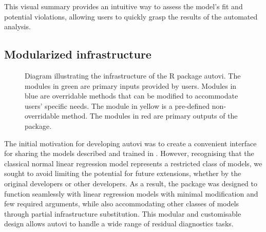 \documentclass[
doublespace,
  times]{anzsauth}
\begin{document}
This visual summary provides an intuitive way to assess the model's fit
and potential violations, allowing users to quickly grasp the results of
the automated analysis.

\subsection{Modularized infrastructure}\label{sec-autovi-infrastructure}

\begin{figure}


\caption{\label{fig-autovi-diag}Diagram illustrating the infrastructure
of the \textsf{R} package \textsf{autovi}. The modules in green are
primary inputs provided by users. Modules in blue are overridable
methods that can be modified to accommodate users' specific needs. The
module in yellow is a pre-defined non-overridable method. The modules in
red are primary outputs of the package.}

\end{figure}%

The initial motivation for developing \textsf{autovi} was to create a
convenient interface for sharing the models described and trained in
\citet{li2024automated}. However, recognising that the classical normal
linear regression model represents a restricted class of models, we
sought to avoid limiting the potential for future extensions, whether by
the original developers or other developers. As a result, the package
was designed to function seamlessly with linear regression models with
minimal modification and few required arguments, while also
accommodating other classes of models through partial infrastructure
substitution. This modular and customisable design allows
\textsf{autovi} to handle a wide range of residual diagnostics tasks.
\end{document}
